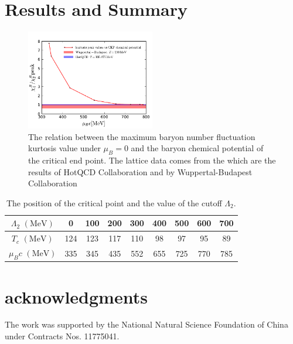 \documentclass[%
reprint,
superscriptaddress,
showpacs,preprintnumbers,
 amsmath,amssymb,
 aps,
prl,
]{revtex4-1}
\begin{document}
\section{Results and Summary}
\label{sec:res}
%
\begin{figure}[t]
\includegraphics[width=0.5\textwidth]{cp}
\caption{The relation between the maximum baryon number fluctuation kurtosis value under $\mu_B=0$ and the baryon chemical potential of the critical end point. The lattice data comes from the \cite{Bazavov:2017dus,Bazavov:2017tot} which are the results of HotQCD Collaboration and \cite{Borsanyi:2013hza} by Wuppertal-Budapest Collaboration}\label{fig:cp}
\end{figure}
%
%
\begin{table}[t]
  \centering
  \begin{tabular}{c||c|c|c|c|c|c|c|c}
    $\Lambda_2\,\,(\mathrm{MeV})$ & 0 & 100 & 200 & 300 & 400 & 500 & 600 & 700 \rule{0pt}{2.6ex}\rule[-1.2ex]{0pt}{0pt}\\ \hline\hline
    $T_c\,\,(\mathrm{MeV})$ &124& 123 & 117 &110 &98&97&95&89 \\\hline
    $\mu_Bc\,\,(\mathrm{MeV})$ &335 &345 &435 &552&655&725&770&785\\\hline

  \end{tabular}
  \caption{The position of the critical point and the value of the cutoff $\Lambda_2$.} 
  \label{tab:cut}
\end{table}
%




\section{acknowledgments}

The work was supported by the National Natural Science Foundation of China under Contracts Nos. 11775041.





\end{document}
